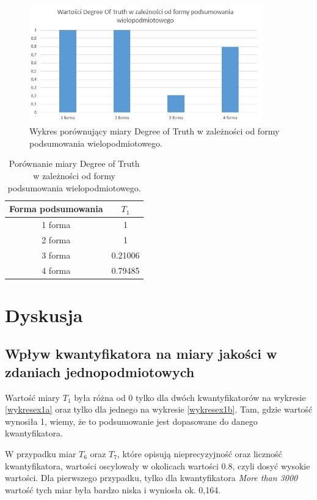 \documentclass{classrep}
\begin{document}
	\begin{figure}[h!]
		\centering
		\includegraphics[width=0.9\textwidth]{ex/4.png}
		\caption{Wykres porównujący miary Degree of Truth w zależności od formy podsumowania wielopodmiotowego.}
		\label{wykresex4a}
	\end{figure}
	
	\begin{table}[h!]
		\centering
		\begin{tabular} {c c}
			\hline
			\textbf{Forma podsumowania} & \textbf{$T_1$} \\ [0.5ex] 
			\hline	
			\hline 
			1 forma & 1 \\ 
			2 forma & 1 \\ 
			3 forma & 0.21006 \\
			4 forma & 0.79485 \\     
			\hline			
		\end{tabular}
		\caption{Porównanie miary Degree of Truth w zależności od formy podsumowania wielopodmiotowego. }
		\label{tabelaex4a}
	\end{table}
	
	\section{Dyskusja} %
	\subsection{Wpływ kwantyfikatora na miary jakości w zdaniach jednopodmiotowych}
	Wartość miary $T_1$ była różna od 0 tylko dla dwóch kwantyfikatorów na wykresie \ref{wykresex1a} oraz tylko dla jednego na wykresie \ref{wykresex1b}. Tam, gdzie wartość wynosiła 1, wiemy, że to podsumowanie jest dopasowane do danego kwantyfikatora. 
	
	W przypadku miar $T_6$ oraz $T_7$, które opisują nieprecyzyjność oraz liczność kwantyfikatora, wartości oscylowały w okolicach wartości 0.8, czyli dosyć wysokie wartości. Dla pierwszego przypadku, tylko dla kwantyfikatora \textsl{More than 3000} wartość tych miar była bardzo niska i wyniosła ok. 0,164. 
	
\end{document}
